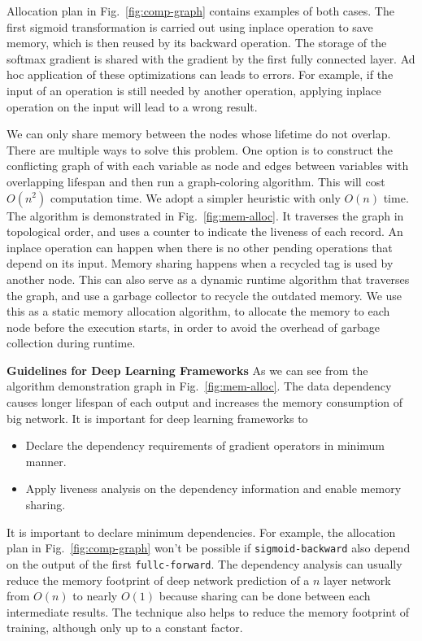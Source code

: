 Allocation plan in Fig.~\ref{fig:comp-graph} contains examples of both cases. The first sigmoid transformation is carried out using inplace operation to save memory, which is then reused by its backward operation. The storage of the softmax gradient is shared with the gradient by the first fully connected layer. Ad hoc application of these optimizations can leads to errors. For example, if the input of an operation is still needed by another operation, applying inplace operation on the input will lead to a wrong result.

We can only share memory between the nodes whose lifetime do not overlap. There are multiple ways to solve this problem. One option is to construct the conflicting graph of with each variable as node and edges between variables with overlapping lifespan and then run a graph-coloring algorithm. This will cost $O(n^2)$ computation time. We adopt a simpler heuristic with only $O(n)$ time. The algorithm is demonstrated in Fig.~\ref{fig:mem-alloc}.
It traverses the graph in topological order, and uses a counter to indicate the liveness of each record. An inplace operation can happen when there is no other pending operations that depend on its input. Memory sharing happens when a recycled tag is used by another node. This can also serve as a dynamic runtime algorithm that traverses the graph, and use a garbage collector to recycle the outdated memory. We use this as a static memory allocation algorithm, to allocate the memory to each node before the execution starts, in order to avoid the overhead of garbage collection during runtime.

 \textbf{Guidelines for Deep Learning Frameworks} As we can see from the algorithm demonstration graph in Fig.~\ref{fig:mem-alloc}.
The data dependency causes longer lifespan of each output and increases the memory consumption of big network. It is important for deep learning frameworks to

\begin{itemize}
   \item Declare the dependency requirements of gradient operators in minimum manner.
   \item Apply liveness analysis on the dependency information and enable memory sharing.
\end{itemize}

It is important to declare minimum dependencies. For example, the allocation plan in Fig.~\ref{fig:comp-graph} won't be possible if
\texttt{sigmoid-backward} also depend on the output of the first \texttt{fullc-forward}.
The dependency analysis can usually reduce the memory footprint of deep network prediction of a $n$ layer network from $O(n)$ to nearly $O(1)$ because sharing can be done between each intermediate results. The technique also helps to reduce the memory footprint of training, although only up to a constant factor.

